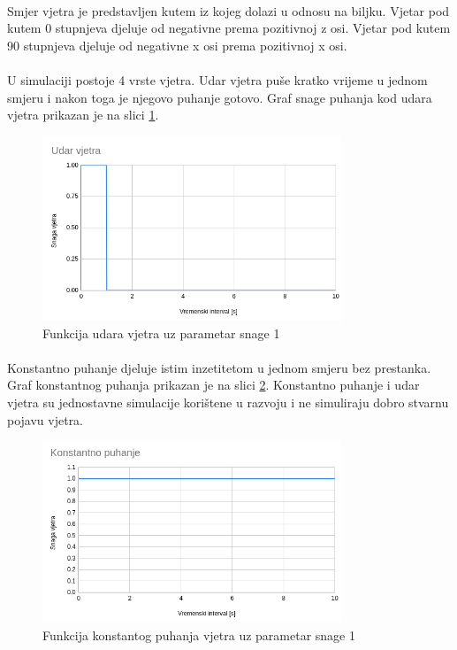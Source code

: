 \documentclass[times, utf8, diplomski]{fer}
\begin{document}
\paragraph{}
Smjer vjetra je predstavljen kutem iz kojeg dolazi u odnosu na biljku. Vjetar pod kutem 0 
stupnjeva djeluje od negativne prema pozitivnoj z osi. Vjetar pod kutem 90 stupnjeva djeluje 
od negativne x osi prema pozitivnoj x osi.

\paragraph{}
U simulaciji postoje 4 vrste vjetra. Udar vjetra puše kratko vrijeme u jednom smjeru i nakon 
toga je njegovo puhanje gotovo. Graf snage puhanja kod udara vjetra prikazan je na slici 
\ref{fig:43-0}.

\begin{figure}[h]
	\centering
	\includegraphics[width=0.8\textwidth]{img/43-0}
	\caption{Funkcija udara vjetra uz parametar snage 1}
	\label{fig:43-0}
\end{figure}

\paragraph{}
Konstantno puhanje djeluje istim inzetitetom u jednom smjeru bez prestanka. Graf konstantnog 
puhanja prikazan je na slici \ref{fig:43-1}. Konstantno puhanje i udar vjetra su jednostavne 
simulacije korištene u razvoju i ne simuliraju dobro stvarnu pojavu vjetra.

\begin{figure}[h]
	\centering
	\includegraphics[width=0.8\textwidth]{img/43-1}
	\caption{Funkcija konstantog puhanja vjetra uz parametar snage 1}
	\label{fig:43-1}
\end{figure}
\end{document}
